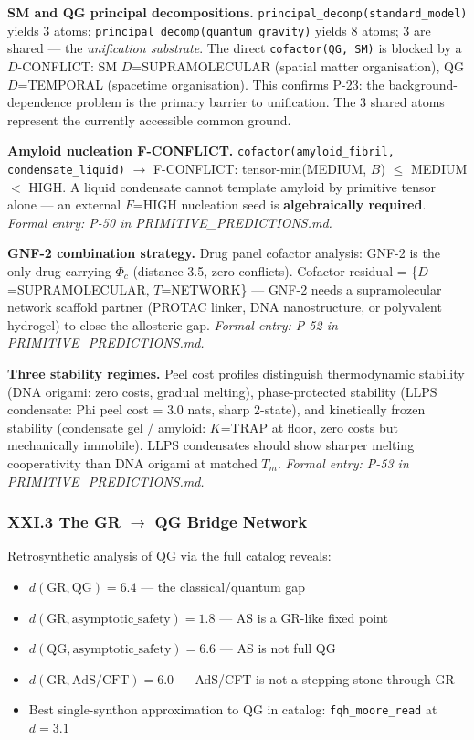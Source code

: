 \documentclass[12pt,a4paper]{article}
\begin{document}
\textbf{SM and QG principal decompositions.} \texttt{principal\_decomp(standard\_model)} yields 3 atoms; \texttt{principal\_decomp(quantum\_gravity)} yields 8 atoms; 3 are shared --- the \emph{unification substrate}. The direct \texttt{cofactor(QG, SM)} is blocked by a $D$-CONFLICT: SM $D$=SUPRAMOLECULAR (spatial matter organisation), QG $D$=TEMPORAL (spacetime organisation). This confirms P-23: the background-dependence problem is the primary barrier to unification. The 3 shared atoms represent the currently accessible common ground.

\textbf{Amyloid nucleation F-CONFLICT.} \texttt{cofactor(amyloid\_fibril, condensate\_liquid)} $\rightarrow$ F-CONFLICT: tensor-min(MEDIUM, $B$) $\leq$ MEDIUM $<$ HIGH. A liquid condensate cannot template amyloid by primitive tensor alone --- an external $F$=HIGH nucleation seed is \textbf{algebraically required}. \emph{Formal entry: P-50 in PRIMITIVE\_PREDICTIONS.md.}

\textbf{GNF-2 combination strategy.} Drug panel cofactor analysis: GNF-2 is the only drug carrying $\Phi_c$ (distance 3.5, zero conflicts). Cofactor residual = \{$D$=SUPRAMOLECULAR, $T$=NETWORK\} --- GNF-2 needs a supramolecular network scaffold partner (PROTAC linker, DNA nanostructure, or polyvalent hydrogel) to close the allosteric gap. \emph{Formal entry: P-52 in PRIMITIVE\_PREDICTIONS.md.}

\textbf{Three stability regimes.} Peel cost profiles distinguish thermodynamic stability (DNA origami: zero costs, gradual melting), phase-protected stability (LLPS condensate: Phi peel cost = 3.0 nats, sharp 2-state), and kinetically frozen stability (condensate gel / amyloid: $K$=TRAP at floor, zero costs but mechanically immobile). LLPS condensates should show sharper melting cooperativity than DNA origami at matched $T_m$. \emph{Formal entry: P-53 in PRIMITIVE\_PREDICTIONS.md.}

\subsubsection{XXI.3 The GR $\rightarrow$ QG Bridge Network}

Retrosynthetic analysis of QG via the full catalog reveals:

\begin{itemize}
    \item $d(\text{GR}, \text{QG}) = 6.4$ --- the classical/quantum gap
    \item $d(\text{GR}, \text{asymptotic\_safety}) = 1.8$ --- AS is a GR-like fixed point
    \item $d(\text{QG}, \text{asymptotic\_safety}) = 6.6$ --- AS is not full QG
    \item $d(\text{GR}, \text{AdS/CFT}) = 6.0$ --- AdS/CFT is not a stepping stone through GR
    \item Best single-synthon approximation to QG in catalog: \texttt{fqh\_moore\_read} at $d = 3.1$
\end{itemize}
\end{document}
